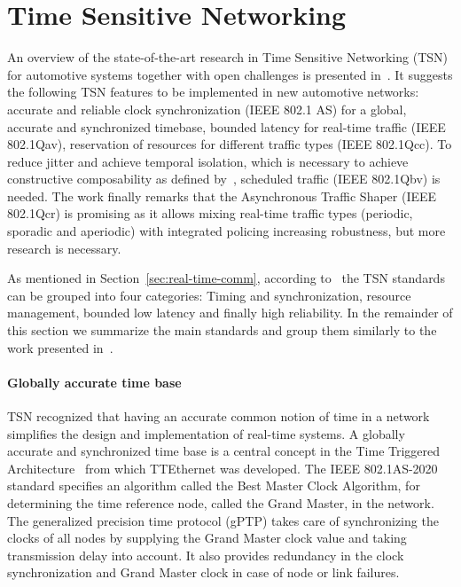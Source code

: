 \section{Time Sensitive Networking}
\label{appendix:tsn}
An overview of the state-of-the-art research in Time Sensitive Networking (TSN) for automotive systems together with open challenges is presented in~\cite{ashjaei2021time}. It suggests the following TSN features to be implemented in new automotive networks: accurate and reliable clock synchronization (IEEE 802.1 AS) for a global, accurate and synchronized timebase, bounded latency for real-time traffic (IEEE 802.1Qav), reservation of resources for different traffic types (IEEE 802.1Qcc). To reduce jitter and achieve temporal isolation, which is necessary to achieve constructive composability as defined by~\cite{kopetz2003time}, scheduled traffic (IEEE 802.1Qbv) is needed. The work finally remarks that the Asynchronous Traffic Shaper (IEEE 802.1Qcr) is promising as it allows mixing real-time traffic types (periodic, sporadic and aperiodic) with integrated policing increasing robustness, but more research is necessary.

As mentioned in Section~\ref{sec:real-time-comm}, according to~\cite{ashjaei2021time} the TSN standards can be grouped into four categories: Timing and synchronization, resource management, bounded low latency and finally high reliability. In the remainder of this section we summarize the main standards and group them similarly to the work presented in~\cite{ashjaei2021time}.

\paragraph{Globally accurate time base} TSN recognized that having an accurate common notion of time in a network simplifies the design and implementation of real-time systems. A globally accurate and synchronized time base is a central concept in the Time Triggered Architecture~\cite{kopetz2003time} from which TTEthernet was developed. The IEEE 802.1AS-2020~\cite{IEEE8021AS} standard specifies an algorithm called the Best Master Clock Algorithm, for determining the time reference node, called the Grand Master, in the network. The generalized precision time protocol (gPTP) takes care of synchronizing the clocks of all nodes by supplying the Grand Master clock value and taking transmission delay into account. It also provides redundancy in the clock synchronization and Grand Master clock in case of node or link failures.

